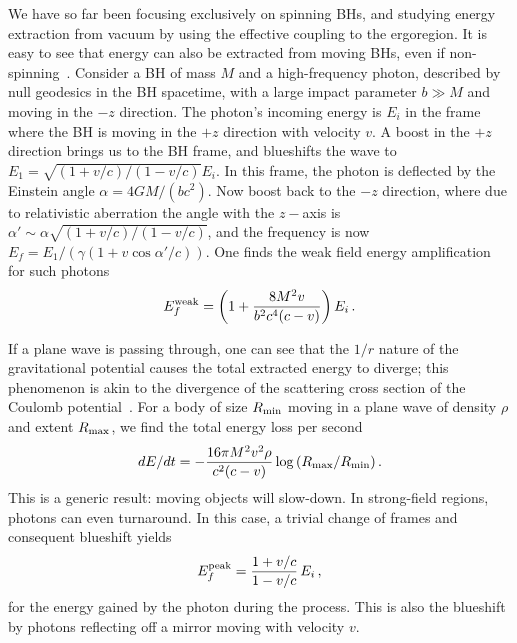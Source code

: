 \documentclass[11pt]{article}
\newcommand{\be}{\begin{equation}}
\newcommand{\ee}{\end{equation}}
\numberwithin{equation}{section} %
\begin{document}
We have so far been focusing exclusively on spinning BHs, and studying energy extraction from vacuum
by using the effective coupling to the ergoregion. It is easy to see that energy can also be extracted from moving BHs,
even if non-spinning~\cite{Bernard:2019nkv,Cardoso:2019dte}.
Consider a BH of mass $M$ and a high-frequency photon, described by null geodesics in the BH spacetime, with a large impact parameter $b\gg M$ and moving in the $-z$ direction.
The photon's incoming energy is $E_i$ in the frame where the BH is moving in the $+z$ direction with velocity $v$.
A boost in the $+z$ direction brings us to the BH frame, and blueshifts the wave to $E_1=\sqrt{(1+v/c)/(1-v/c)}E_i$.
In this frame, the photon is deflected by the Einstein angle $\alpha=4GM/(bc^2)$. Now boost back to the $-z$ direction, where due to relativistic aberration the angle with the $z-$axis is $\alpha'\sim \alpha\sqrt{(1+v/c)/(1-v/c)}$, and the frequency is now
$E_f=E_1/(\gamma(1+v\cos\alpha'/c))$. One finds the weak field energy amplification for such photons
%
\be
E_f^{\rm weak}=\left(1+\frac{8M^2v}{b^2c^4(c-v)}\right)E_i\,.\label{deflection_weak}
\ee
%

If a plane wave is passing through, one can see that the $1/r$ nature of the gravitational potential causes the total extracted energy to diverge; this phenomenon is akin to the divergence of the scattering cross section of the Coulomb potential~\cite{Merzbacher}. 
For a body of size $R_{\rm min}$ moving in a plane wave of density $\rho$ and extent $R_{\rm max}$, we find the total energy loss per second
%
\be
d E/dt=-\frac{16\pi M^2v^2\rho}{c^2(c-v)}\log{\left(R_{\rm max}/R_{\rm min}\right)}\,.
\ee
%
This is a generic result: moving objects will slow-down. In strong-field regions, photons can even turnaround.
In this case, a trivial change of frames and consequent blueshift yields
%
\be
E_f^{\rm peak}=\frac{1+v/c}{1-v/c}\,E_i\,,\label{max_amp}
\ee
%
for the energy gained by the photon during the process. This is also the blueshift by photons reflecting off a mirror moving with velocity $v$.  
\end{document}
